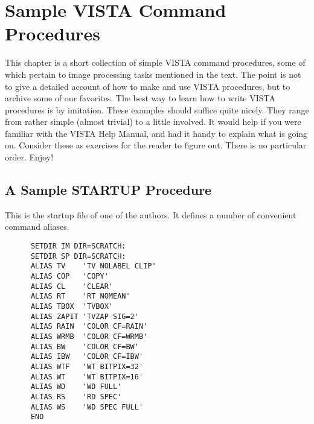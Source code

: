 %
%
%
%
%
%

%
%
%
%
%

\chapter{Sample VISTA Command Procedures}

This chapter is a short collection of simple VISTA command procedures, some of
which pertain to image processing tasks mentioned in the text. The point is
not to give a detailed account of how to make and use VISTA procedures, but to
archive some of our favorites.  The best way to learn how to write VISTA
procedures is by imitation.  These examples should suffice quite nicely.  They
range from rather simple (almost trivial) to a little involved.  It would help
if you were familiar with the VISTA Help Manual, and had it handy to explain
what is going on.  Consider these as exercises for the reader to figure out.
There is no particular order.  Enjoy!


\section{A Sample STARTUP Procedure}

This is the startup file of one of the authors.  It defines a number of
convenient command aliases.

\begin{verbatim}
      SETDIR IM DIR=SCRATCH:
      SETDIR SP DIR=SCRATCH:
      ALIAS TV    'TV NOLABEL CLIP'
      ALIAS COP   'COPY'
      ALIAS CL    'CLEAR'
      ALIAS RT    'RT NOMEAN'
      ALIAS TBOX  'TVBOX'
      ALIAS ZAPIT 'TVZAP SIG=2'
      ALIAS RAIN  'COLOR CF=RAIN'
      ALIAS WRMB  'COLOR CF=WRMB'
      ALIAS BW    'COLOR CF=BW'
      ALIAS IBW   'COLOR CF=IBW'
      ALIAS WTF   'WT BITPIX=32'
      ALIAS WT    'WT BITPIX=16'
      ALIAS WD    'WD FULL'
      ALIAS RS    'RD SPEC'
      ALIAS WS    'WD SPEC FULL'
      END
\end{verbatim}

